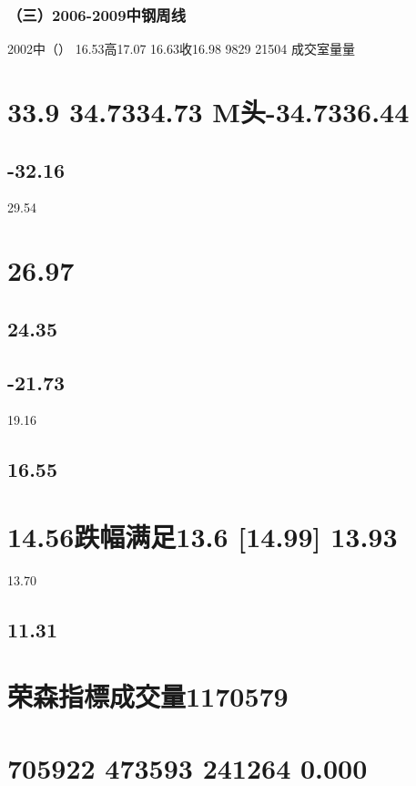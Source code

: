 \documentclass{article}
\begin{document}
\subsubsection{（三）2006-2009中钢周线}

2002中（） 16.53高17.07 16.63收16.98 9829 21504 成交室量量

\section{33.9 34.7334.73 M头-34.7336.44}

\subsection{-32.16}

29.54

\section{26.97}

\subsection{24.35}

\subsection{-21.73}

19.16

\subsection{16.55}

\section{14.56跌幅满足13.6 [14.99] 13.93}

13.70

\subsection{11.31}

\section{荣森指標成交量1170579}

\section{705922 473593 241264 0.000}
\end{document}
